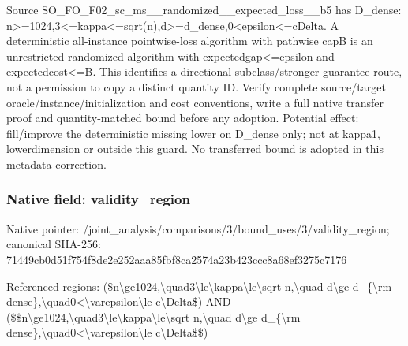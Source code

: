\documentclass[10pt,a4paper]{article}
\begin{document}
\begingroup\raggedright\sloppy Source SO\_\allowbreak{}FO\_\allowbreak{}F02\_\allowbreak{}sc\_\allowbreak{}ms\_\allowbreak{}\_\allowbreak{}randomized\_\allowbreak{}\_\allowbreak{}expected\_\allowbreak{}loss\_\allowbreak{}\_\allowbreak{}b5 has D\_\allowbreak{}dense:\allowbreak{} n>=\allowbreak{}1024,\allowbreak{}3<=\allowbreak{}kappa<=\allowbreak{}sqrt(n),\allowbreak{}d>=\allowbreak{}d\_\allowbreak{}dense,\allowbreak{}0<epsilon<=\allowbreak{}cDelta. A deterministic all-instance pointwise-loss algorithm with pathwise capB is an unrestricted randomized algorithm with expectedgap<=\allowbreak{}epsilon and expectedcost<=\allowbreak{}B. This identifies a directional subclass/\allowbreak{}stronger-guarantee route,\allowbreak{} not a permission to copy a distinct quantity ID. Verify complete source/\allowbreak{}target oracle/\allowbreak{}instance/\allowbreak{}initialization and cost conventions,\allowbreak{} write a full native transfer proof and quantity-matched bound before any adoption. Potential effect:\allowbreak{} fill/\allowbreak{}improve the deterministic missing lower on D\_\allowbreak{}dense only;\allowbreak{} not at kappa1,\allowbreak{} lowerdimension or outside this guard. No transferred bound is adopted in this metadata correction.\par\endgroup

\subsubsection{Native field: validity\_\allowbreak{}region}
Native pointer: /joint\_\allowbreak{}analysis/comparisons/3/bound\_\allowbreak{}uses/3/validity\_\allowbreak{}region; canonical SHA-256: 71449cb0d51f754f8de2e252aaa85fbf8ca2574a23b423ccc8a68ef3275c7176

\begingroup\raggedright\sloppy Referenced regions:\allowbreak{} (\$n\textbackslash{}ge1024,\allowbreak{}\textbackslash{}quad3\textbackslash{}le\textbackslash{}kappa\textbackslash{}le\textbackslash{}sqrt n,\allowbreak{}\textbackslash{}quad d\textbackslash{}ge d\_\allowbreak{}\{\textbackslash{}rm dense\},\allowbreak{}\textbackslash{}quad0<\textbackslash{}varepsilon\textbackslash{}le c\textbackslash{}Delta\$) AND (\$\$n\textbackslash{}ge1024,\allowbreak{}\textbackslash{}quad3\textbackslash{}le\textbackslash{}kappa\textbackslash{}le\textbackslash{}sqrt n,\allowbreak{}\textbackslash{}quad d\textbackslash{}ge d\_\allowbreak{}\{\textbackslash{}rm dense\},\allowbreak{}\textbackslash{}quad0<\textbackslash{}varepsilon\textbackslash{}le c\textbackslash{}Delta\$\$)\par\endgroup
\end{document}
